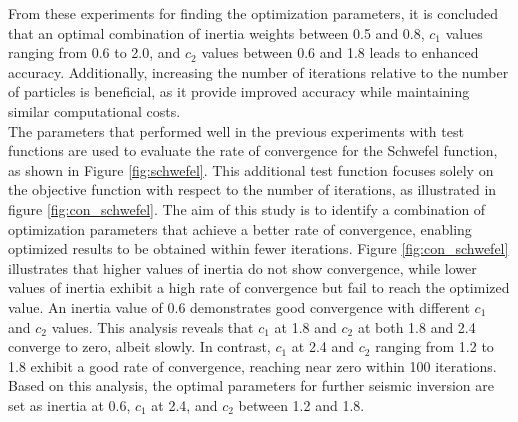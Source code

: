 \documentclass[paper,revised]{geophysics}
\begin{document}
From these experiments for finding the optimization parameters, it is concluded that an optimal combination of inertia weights between 0.5 and 0.8, \(c_1\) values ranging from 0.6 to 2.0, and \(c_2\) values between 0.6 and 1.8 leads to enhanced accuracy. Additionally, increasing the number of iterations relative to the number of particles is beneficial, as it provide improved accuracy while maintaining similar computational costs.
\\
The parameters that performed well in the previous experiments with test functions are used to evaluate the rate of convergence for the Schwefel function, as shown in Figure \ref{fig:schwefel}. This additional test function focuses solely on the objective function with respect to the number of iterations, as illustrated in figure \ref{fig:con_schwefel}. The aim of this study is to identify a combination of optimization parameters that achieve a better rate of convergence, enabling optimized results to be obtained within fewer iterations. Figure \ref{fig:con_schwefel} illustrates that higher values of inertia do not show convergence, while lower values of inertia exhibit a high rate of convergence but fail to reach the optimized value. An inertia value of 0.6 demonstrates good convergence with different \(c_1\) and \(c_2\) values. This analysis reveals that \(c_1\) at 1.8 and \(c_2\) at both 1.8 and 2.4 converge to zero, albeit slowly. In contrast, \(c_1\) at 2.4 and \(c_2\) ranging from 1.2 to 1.8 exhibit a good rate of convergence, reaching near zero within 100 iterations. Based on this analysis, the optimal parameters for further seismic inversion are set as inertia at 0.6, \(c_1\) at 2.4, and \(c_2\) between 1.2 and 1.8.
%
\end{document}
